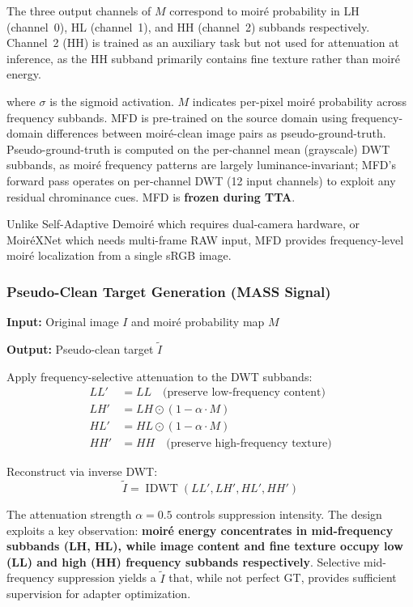 \documentclass[review,10pt]{elsarticle}
\begin{document}
The three output channels of $M$ correspond to moir\'{e} probability in LH (channel~0), HL (channel~1), and HH (channel~2) subbands respectively. Channel~2 (HH) is trained as an auxiliary task but not used for attenuation at inference, as the HH subband primarily contains fine texture rather than moir\'{e} energy.

where $\sigma$ is the sigmoid activation. $M$ indicates per-pixel moir\'{e} probability across frequency subbands. MFD is pre-trained on the source domain using frequency-domain differences between moir\'{e}-clean image pairs as pseudo-ground-truth. Pseudo-ground-truth is computed on the per-channel mean (grayscale) DWT subbands, as moir\'{e} frequency patterns are largely luminance-invariant; MFD's forward pass operates on per-channel DWT (12 input channels) to exploit any residual chrominance cues. MFD is \textbf{frozen during TTA}.

Unlike Self-Adaptive Demoir\'{e} \cite{liu2020wavelet} which requires dual-camera hardware, or Moir\'{e}XNet \cite{li2025moirexnet} which needs multi-frame RAW input, MFD provides frequency-level moir\'{e} localization from a single sRGB image.

\subsubsection{Pseudo-Clean Target Generation (MASS Signal)}
\label{sec:mass}

\textbf{Input:} Original image $I$ and moir\'{e} probability map $M$

\textbf{Output:} Pseudo-clean target $\tilde{I}$

Apply frequency-selective attenuation to the DWT subbands:
\begin{align}
LL' &= LL \quad \text{(preserve low-frequency content)} \\
LH' &= LH \odot (1 - \alpha \cdot M) \\
HL' &= HL \odot (1 - \alpha \cdot M) \\
HH' &= HH \quad \text{(preserve high-frequency texture)}
\end{align}

Reconstruct via inverse DWT:
\begin{equation}
\tilde{I} = \operatorname{IDWT}(LL', LH', HL', HH')
\end{equation}

The attenuation strength $\alpha = 0.5$ controls suppression intensity. The design exploits a key observation: \textbf{moir\'{e} energy concentrates in mid-frequency subbands (LH, HL), while image content and fine texture occupy low (LL) and high (HH) frequency subbands respectively}. Selective mid-frequency suppression yields a $\tilde{I}$ that, while not perfect GT, provides sufficient supervision for adapter optimization.
\end{document}
